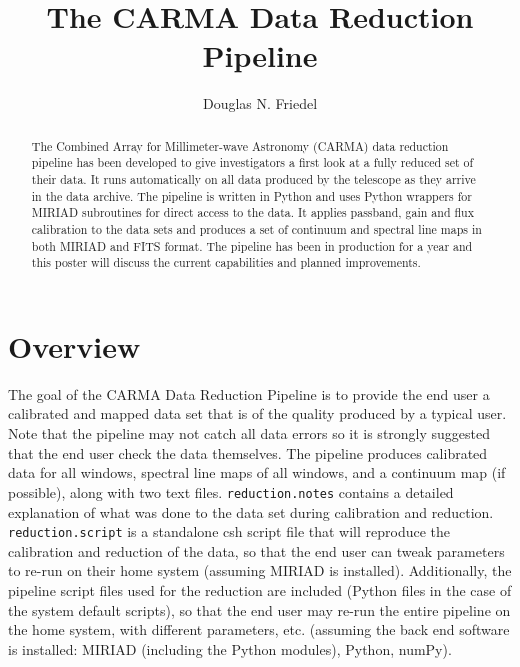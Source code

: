 
\resetcounters


\title{The CARMA Data Reduction Pipeline}
\author{Douglas N. Friedel}


\begin{abstract}
The Combined Array for Millimeter-wave Astronomy (CARMA) data reduction pipeline has been developed to give investigators a first look at a fully reduced set of their data. It runs automatically on all data produced by the telescope as they arrive in the data archive. The pipeline is written in Python and uses Python wrappers for MIRIAD subroutines for direct access to the data. It applies passband, gain and flux calibration to the data sets and produces a set of continuum and spectral line maps in both MIRIAD and FITS format. The pipeline has been in production for a year and this poster will discuss the current capabilities and planned improvements.
\end{abstract}

\section{Overview}

The goal of the CARMA Data Reduction Pipeline is to provide the end user a calibrated and mapped data set that is of the quality produced by a typical user. Note that the pipeline may not catch all data errors so it is strongly suggested that the end user check the data themselves. The pipeline produces calibrated data for all windows, spectral line maps of all windows, and a continuum map (if possible), along with two text files. \verb#reduction.notes# contains a detailed explanation of what was done to the data set during calibration and reduction. \verb#reduction.script# is a standalone csh script file that will reproduce the calibration and reduction of the data, so that the end user can tweak parameters to re-run on their home system (assuming MIRIAD is installed). Additionally, the pipeline script files used for the reduction are included (Python files in the case of the system default scripts), so that the end user may re-run the entire pipeline on the home system, with different parameters, etc. (assuming the back end software is installed: MIRIAD (including the Python modules), Python, numPy).

